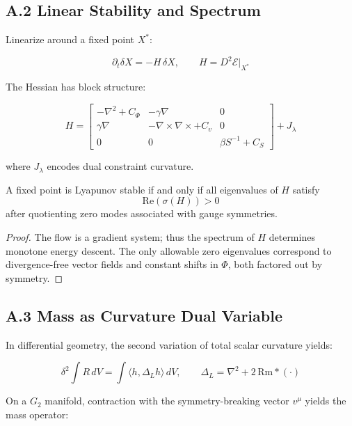 \documentclass[11pt,a4paper]{article}
\begin{document}
\subsection{A.2 Linear Stability and Spectrum}

Linearize around a fixed point \(X^\ast\):

\[
\partial_t \delta X = -H \, \delta X, \qquad
H = D^2 \mathcal{E}|_{X^\ast}
\]

The Hessian has block structure:

\[
H = \begin{bmatrix}
-\nabla^2 + C_{\Phi} & -\gamma \nabla & 0 \\
\gamma \nabla & -\nabla \times \nabla \times + C_v & 0 \\
0 & 0 & \beta S^{-1} + C_S
\end{bmatrix} + J_\lambda
\]

where \(J_\lambda\) encodes dual constraint curvature.

\begin{theorem}
A fixed point is Lyapunov stable if and only if all eigenvalues of \(H\) satisfy
\[
\mathrm{Re}(\sigma(H)) > 0
\]
after quotienting zero modes associated with gauge symmetries.
\end{theorem}

\begin{proof}
The flow is a gradient system; thus the spectrum of \(H\) determines monotone energy descent. The only allowable zero eigenvalues correspond to divergence-free vector fields and constant shifts in \(\Phi\), both factored out by symmetry.
\end{proof}

\subsection{A.3 Mass as Curvature Dual Variable}

In differential geometry, the second variation of total scalar curvature yields:

\[
\delta^2 \int R \, dV = \int \langle h, \Delta_L h \rangle \, dV, \qquad \Delta_L = \nabla^2 + 2\,\mathrm{Rm} * (\cdot)
\]

On a \(G_2\) manifold, contraction with the symmetry-breaking vector \(v^\mu\) yields the mass operator:
\end{document}
